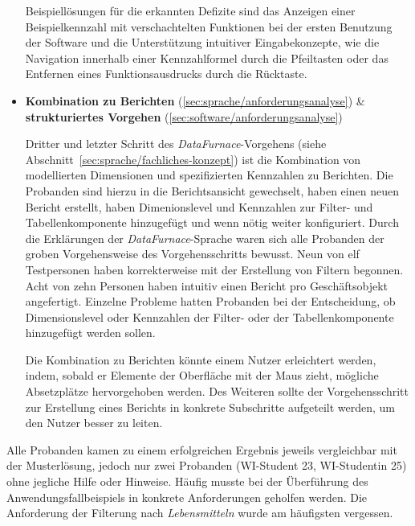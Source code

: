 \documentclass[
  language=german, %
  type=bachelor,%
  ngerman
]{isthesis}
\begin{document}
\begin{content}
\begin{itemize}
    Beispiellösungen für die erkannten Defizite sind das Anzeigen einer
    Beispielkennzahl mit verschachtelten Funktionen bei der ersten Benutzung
    der Software und die Unterstützung intuitiver Eingabekonzepte, wie die
    Navigation innerhalb einer Kennzahlformel durch die Pfeiltasten oder
    das Entfernen eines Funktionsausdrucks durch die Rücktaste.

  \item \textbf{Kombination zu Berichten} (\ref{sec:sprache/anforderungsanalyse}) \& \textbf{strukturiertes Vorgehen} (\ref{sec:software/anforderungsanalyse})

    Dritter und letzter Schritt des \textit{DataFurnace}-Vorgehens (siehe
    Abschnitt~\ref{sec:sprache/fachliches-konzept}) ist die Kombination von
    modellierten Dimensionen und spezifizierten Kennzahlen zu Berichten. Die
    Probanden sind hierzu in die Berichtsansicht gewechselt, haben einen neuen
    Bericht erstellt, haben Dimenionslevel und Kennzahlen zur Filter- und
    Tabellenkomponente hinzugefügt und wenn nötig weiter konfiguriert. Durch
    die Erklärungen der \textit{DataFurnace}-Sprache waren sich alle Probanden
    der groben Vorgehensweise des Vorgehensschritts bewusst. Neun von elf
    Testpersonen haben korrekterweise mit der Erstellung von Filtern begonnen.
    Acht von zehn Personen haben intuitiv einen Bericht pro Geschäftsobjekt
    angefertigt.  Einzelne Probleme hatten Probanden bei der Entscheidung, ob
    Dimensionslevel oder Kennzahlen der Filter- oder der Tabellenkomponente
    hinzugefügt werden sollen. 

    Die Kombination zu Berichten könnte einem Nutzer erleichtert werden, indem,
    sobald er Elemente der Oberfläche mit der Maus zieht, mögliche Absetzplätze
    hervorgehoben werden. Des Weiteren sollte der Vorgehensschritt zur Erstellung
    eines Berichts in konkrete Subschritte aufgeteilt werden, um den Nutzer
    besser zu leiten.


\end{itemize}

Alle Probanden kamen zu einem erfolgreichen Ergebnis jeweils vergleichbar mit
der Musterlösung, jedoch nur zwei Probanden (WI-Student 23, WI-Studentin 25)
ohne jegliche Hilfe oder Hinweise. Häufig musste bei der Überführung des
Anwendungsfallbeispiels in konkrete Anforderungen geholfen werden. Die
Anforderung der Filterung nach \textit{Lebensmitteln} wurde am häufigsten
vergessen.




\end{content}
\end{document}
